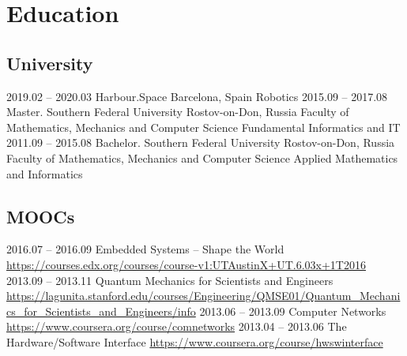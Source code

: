 \documentclass[11pt,a4paper]{moderncv}
\newcommand{\EngRus}[2]{#1}
\newcommand{\BirthPlaceOfValour}{\EngRus{Rostov-on-Don, Russia}{Ростов-на-Дону, Россия}}
\newcommand{\SunshinePalace}{\EngRus{Barcelona, Spain}{Барселона, Испания}}
\newcommand{\WorkDate}[4]{\small{\EngRus{#2.#1 -- #4.#3}{#1.#2 -- #3.#4}}}
\begin{document}
\section{\EngRus{Education}{Образование}}
  \subsection{\EngRus{University}{Университет}}
    \cventry
      {\WorkDate{02}{2019}{03}{2020}}
      {\EngRus{Harbour.Space}{Harbour.Space}}
      {\SunshinePalace}
      {}
      {\EngRus{Robotics}{Робототехника}}
      {}
    \cventry
      {\WorkDate{09}{2015}{08}{2017}}
      {\EngRus{Master. Southern Federal University}{Магистратура. Южный Федеральный Университет}}
      {\BirthPlaceOfValour}
      {\EngRus{Faculty of Mathematics, Mechanics and Computer Science}
      {Институт математики, механики и компьютерных наук им. И.И. Воровича}}
      {\EngRus{Fundamental Informatics and IT}{Фундаментальная информатика и информационные технологии}}
      {}
    \cventry
      {\WorkDate{09}{2011}{08}{2015}}
      {\EngRus{Bachelor. Southern Federal University}{Бакалавриат. Южный Федеральный Университет}}
      {\BirthPlaceOfValour}
      {\EngRus{Faculty of Mathematics, Mechanics and Computer Science}
      {Институт математики, механики и компьютерных наук им. И.И. Воровича}}
      {\EngRus{Applied Mathematics and Informatics}{Прикладная математика и информатика}}
      {}
  \subsection{\EngRus{MOOCs}{Онлайн курсы}}
    \cventry
      {\WorkDate{07}{2016}{09}{2016}}
      {Embedded Systems -- Shape the World}
      {\newline\url{https://courses.edx.org/courses/course-v1:UTAustinX+UT.6.03x+1T2016}}
      {}{}{}
    \cventry
      {\WorkDate{09}{2013}{11}{2013}}
      {Quantum Mechanics for Scientists and Engineers}
      {\newline\url{https://lagunita.stanford.edu/courses/Engineering/QMSE01/Quantum_Mechanics_for_Scientists_and_Engineers/info}}
      {}{}{}
    \cventry
      {\WorkDate{06}{2013}{09}{2013}}
      {Computer Networks}
      {\newline\url{https://www.coursera.org/course/comnetworks}}
      {}{}{}
    \cventry
      {\WorkDate{04}{2013}{06}{2013}}
      {The Hardware/Software Interface}
      {\newline\url{https://www.coursera.org/course/hwswinterface}}
      {}{}{}
\end{document}
